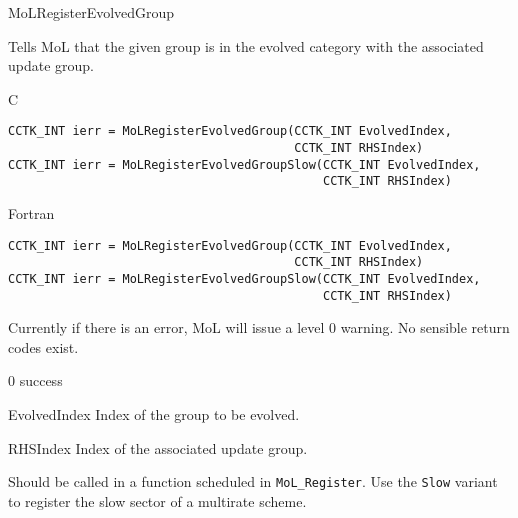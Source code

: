 \begin{FunctionDescription}{MoLRegisterEvolvedGroup}
  \label{CactusBase_MoL_MoLRegisterEvolvedGroup}
  
  Tells MoL that the given group is in the evolved category with the
  associated update group.

  \begin{SynopsisSection}
    \begin{Synopsis}{C}
\begin{verbatim}
CCTK_INT ierr = MoLRegisterEvolvedGroup(CCTK_INT EvolvedIndex, 
                                        CCTK_INT RHSIndex)
CCTK_INT ierr = MoLRegisterEvolvedGroupSlow(CCTK_INT EvolvedIndex, 
                                            CCTK_INT RHSIndex)
\end{verbatim}
    \end{Synopsis}
    \begin{Synopsis}{Fortran}
\begin{verbatim}
CCTK_INT ierr = MoLRegisterEvolvedGroup(CCTK_INT EvolvedIndex, 
                                        CCTK_INT RHSIndex)
CCTK_INT ierr = MoLRegisterEvolvedGroupSlow(CCTK_INT EvolvedIndex, 
                                            CCTK_INT RHSIndex)
\end{verbatim}
    \end{Synopsis}
  \end{SynopsisSection}

  \begin{ResultSection}
    \begin{ResultNote}
      Currently if there is an error, MoL will issue a level 0
      warning. No sensible return codes exist.
    \end{ResultNote}
    \begin{Result}{\rm 0}
      success
    \end{Result}
  \end{ResultSection}

  \begin{ParameterSection}
    \begin{Parameter}{EvolvedIndex}
      Index of the group to be evolved.
    \end{Parameter}
    \begin{Parameter}{RHSIndex}
      Index of the associated update group.
    \end{Parameter}
  \end{ParameterSection}

  \begin{Discussion}
    Should be called in a function scheduled in {\tt MoL\_Register}. Use the
    {\tt Slow} variant to register the slow sector of a multirate scheme.
  \end{Discussion}


\end{FunctionDescription}
